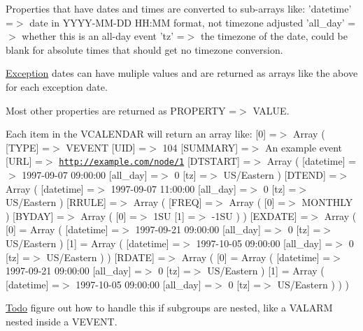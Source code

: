 Properties that have dates and times are converted to sub-\/arrays like: 'datetime' =$>$ date in YYYY-\/MM-\/DD HH:MM format, not timezone adjusted 'all\_\-day' =$>$ whether this is an all-\/day event 'tz' =$>$ the timezone of the date, could be blank for absolute times that should get no timezone conversion.

\hyperlink{classException}{Exception} dates can have muliple values and are returned as arrays like the above for each exception date.

Most other properties are returned as PROPERTY =$>$ VALUE.

Each item in the VCALENDAR will return an array like: \mbox{[}0\mbox{]} =$>$ Array ( \mbox{[}TYPE\mbox{]} =$>$ VEVENT \mbox{[}UID\mbox{]} =$>$ 104 \mbox{[}SUMMARY\mbox{]} =$>$ An example event \mbox{[}URL\mbox{]} =$>$ \href{http://example.com/node/1}{\tt http://example.com/node/1} \mbox{[}DTSTART\mbox{]} =$>$ Array ( \mbox{[}datetime\mbox{]} =$>$ 1997-\/09-\/07 09:00:00 \mbox{[}all\_\-day\mbox{]} =$>$ 0 \mbox{[}tz\mbox{]} =$>$ US/Eastern ) \mbox{[}DTEND\mbox{]} =$>$ Array ( \mbox{[}datetime\mbox{]} =$>$ 1997-\/09-\/07 11:00:00 \mbox{[}all\_\-day\mbox{]} =$>$ 0 \mbox{[}tz\mbox{]} =$>$ US/Eastern ) \mbox{[}RRULE\mbox{]} =$>$ Array ( \mbox{[}FREQ\mbox{]} =$>$ Array ( \mbox{[}0\mbox{]} =$>$ MONTHLY ) \mbox{[}BYDAY\mbox{]} =$>$ Array ( \mbox{[}0\mbox{]} =$>$ 1SU \mbox{[}1\mbox{]} =$>$ -\/1SU ) ) \mbox{[}EXDATE\mbox{]} =$>$ Array ( \mbox{[}0\mbox{]} = Array ( \mbox{[}datetime\mbox{]} =$>$ 1997-\/09-\/21 09:00:00 \mbox{[}all\_\-day\mbox{]} =$>$ 0 \mbox{[}tz\mbox{]} =$>$ US/Eastern ) \mbox{[}1\mbox{]} = Array ( \mbox{[}datetime\mbox{]} =$>$ 1997-\/10-\/05 09:00:00 \mbox{[}all\_\-day\mbox{]} =$>$ 0 \mbox{[}tz\mbox{]} =$>$ US/Eastern ) ) \mbox{[}RDATE\mbox{]} =$>$ Array ( \mbox{[}0\mbox{]} = Array ( \mbox{[}datetime\mbox{]} =$>$ 1997-\/09-\/21 09:00:00 \mbox{[}all\_\-day\mbox{]} =$>$ 0 \mbox{[}tz\mbox{]} =$>$ US/Eastern ) \mbox{[}1\mbox{]} = Array ( \mbox{[}datetime\mbox{]} =$>$ 1997-\/10-\/05 09:00:00 \mbox{[}all\_\-day\mbox{]} =$>$ 0 \mbox{[}tz\mbox{]} =$>$ US/Eastern ) ) )

\begin{Desc}
\item[\hyperlink{todo__todo000049}{Todo}]figure out how to handle this if subgroups are nested, like a VALARM nested inside a VEVENT.\end{Desc}


